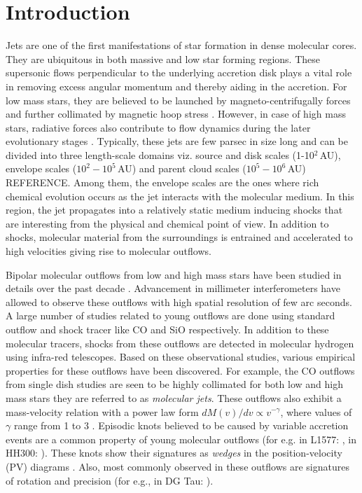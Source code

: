 \documentclass[useAMS,usenatbib,letters]{mn2e}
\newcommand{\refer}{{\color{orange}REFERENCE}}
\begin{document}
%
%


\section{Introduction}
Jets are one of the first manifestations of star
formation in dense molecular cores. They are ubiquitous in both
massive and low star forming regions. These supersonic flows
perpendicular to the underlying accretion disk plays a vital role in
removing excess angular momentum and thereby aiding in the accretion. 
For low mass stars, they are believed to be launched by magneto-centrifugally forces and
further collimated by magnetic hoop stress
\citep[][]{Blandford:1982p892, Konigl:2000p607}. However, in case of
high mass stars, radiative forces also contribute to flow dynamics
during the later evolutionary stages \cite{Vaidya:2011p8992}. 
Typically, these jets are few parsec in size long and can be divided into
three length-scale domains viz. source and disk scales (1-10$^{2}\,$AU),
envelope scales ($10^{2} - 10^{5}$\,AU) and parent cloud scales
($10^{5} - 10^{6}$\,AU) \refer. Among them, the envelope scales are
the ones where rich chemical evolution occurs as the jet interacts
with the molecular medium. In this region, the jet propagates into a
relatively static medium inducing shocks that are interesting from the
physical and chemical point of view. In addition to shocks, molecular
material from the surroundings is entrained and accelerated to high
velocities giving rise to molecular outflows.
%

Bipolar molecular outflows from low and high mass stars
have been studied in details over the past 
decade \citep[see reviews by][]{Bachiller:1996p4692,Arce:2007p798,
Tafalla:2011p14051}. Advancement in millimeter interferometers have
allowed to observe these outflows with high spatial resolution of
few arc seconds. A large number of studies related to young
outflows are done using standard outflow and shock tracer
like CO and SiO respectively. In addition to these molecular tracers,
shocks from these outflows are detected in molecular hydrogen using
infra-red telescopes. Based on these observational studies, various
empirical properties for these outflows have been discovered. For
example, the CO outflows from single dish studies are seen to be
highly collimated for both low and high mass stars
\citep[for e.g.,][]{Gueth:1999p4683, Beuther:2002p3574} they are
referred to as {\em{molecular jets}}. These outflows also exhibit a
mass-velocity relation with a power law form $ dM(v)/dv \propto
v^{-\gamma}$, where values of $\gamma$ range from 1 to 3 \cite{Downes:2003p9946}. Episodic
knots believed to be caused by variable accretion events are a common property
of young molecular outflows (for e.g. in L1577:
\citealt{Gueth:1998p14058}, in HH300: \citealt{Arce:2001p14064}). These knots show their signatures
as {\em{wedges}} in the position-velocity (PV) diagrams \cite{Arce:2001p14065}. Also, most
commonly observed in these outflows are signatures of rotation and
precision (for e.g., in DG Tau: \citealt{Bacciotti:2002p2084}).
%
\end{document}
